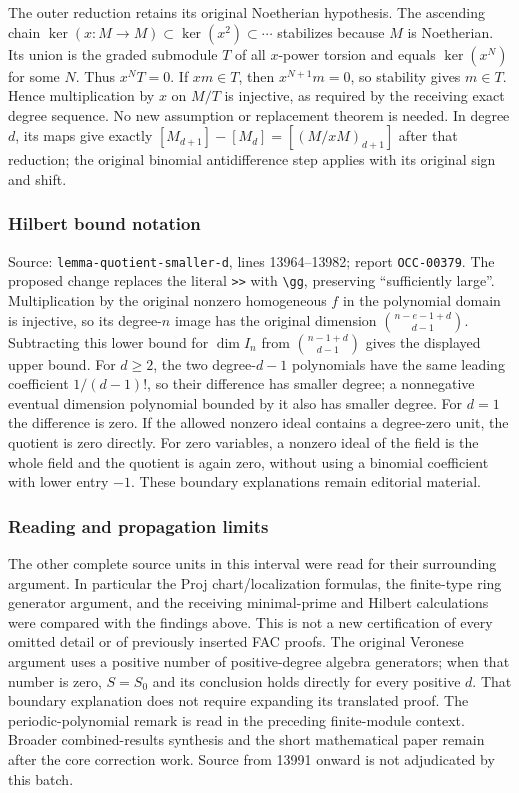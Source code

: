The outer reduction retains its original Noetherian hypothesis. The ascending chain \(\ker(x:M\to M)\subset\ker(x^2)\subset\cdots\) stabilizes because \(M\) is Noetherian. Its union is the graded submodule \(T\) of all \(x\)-power torsion and equals \(\ker(x^N)\) for some \(N\). Thus \(x^NT=0\). If \(xm\in T\), then \(x^{N+1}m=0\), so stability gives \(m\in T\). Hence multiplication by \(x\) on \(M/T\) is injective, as required by the receiving exact degree sequence. No new assumption or replacement theorem is needed. In degree \(d\), its maps give exactly \([M_{d+1}]-[M_d]=[(M/xM)_{d+1}]\) after that reduction; the original binomial antidifference step applies with its original sign and shift.

\subsubsection{Hilbert bound notation}\label{hilbert-bound-notation}

Source: \texttt{lemma-quotient-smaller-d}, lines 13964--13982; report \texttt{OCC-00379}. The proposed change replaces the literal \texttt{\textgreater{}\textgreater{}} with \texttt{\textbackslash{}gg}, preserving ``sufficiently large''. Multiplication by the original nonzero homogeneous \(f\) in the polynomial domain is injective, so its degree-\(n\) image has the original dimension \(\binom{n-e-1+d}{d-1}\). Subtracting this lower bound for \(\dim I_n\) from \(\binom{n-1+d}{d-1}\) gives the displayed upper bound. For \(d\geq2\), the two degree-\(d-1\) polynomials have the same leading coefficient \(1/(d-1)!\), so their difference has smaller degree; a nonnegative eventual dimension polynomial bounded by it also has smaller degree. For \(d=1\) the difference is zero. If the allowed nonzero ideal contains a degree-zero unit, the quotient is zero directly. For zero variables, a nonzero ideal of the field is the whole field and the quotient is again zero, without using a binomial coefficient with lower entry \(-1\). These boundary explanations remain editorial material.

\subsubsection{Reading and propagation limits}\label{reading-and-propagation-limits}

The other complete source units in this interval were read for their surrounding argument. In particular the Proj chart/localization formulas, the finite-type ring generator argument, and the receiving minimal-prime and Hilbert calculations were compared with the findings above. This is not a new certification of every omitted detail or of previously inserted FAC proofs. The original Veronese argument uses a positive number of positive-degree algebra generators; when that number is zero, \(S=S_0\) and its conclusion holds directly for every positive \(d\). That boundary explanation does not require expanding its translated proof. The periodic-polynomial remark is read in the preceding finite-module context. Broader combined-results synthesis and the short mathematical paper remain after the core correction work. Source from 13991 onward is not adjudicated by this batch.
